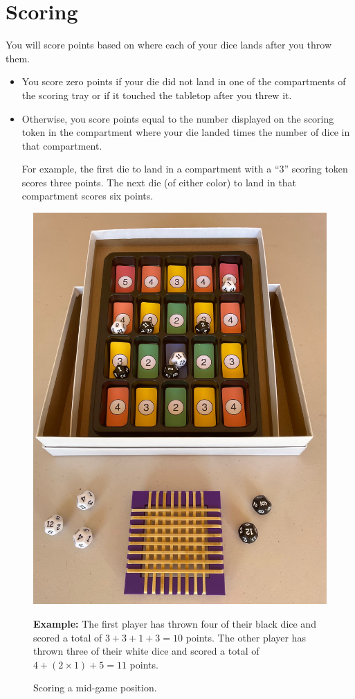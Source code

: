 \documentclass[parskip=half]{scrartcl}
\begin{document}
\section*{Scoring}\label{section:scoring}
You will score points based on where each of your dice lands after you throw them.
\begin{itemize}[leftmargin=*]
\item You score zero points if your die did not land in one of the compartments of the scoring tray or if it touched the tabletop after you threw it.
\item Otherwise, you score points equal to the number displayed on the scoring token in the compartment where your die landed times the number of dice in that compartment.

For example, the first die to land in a compartment with a ``3'' scoring token scores three points. The next die (of either color) to land in that compartment scores six points.
\end{itemize}

\begin{figure}
\raggedright
\includegraphics[width=\textwidth]{rebound_action_shot_3.jpg}
\bigskip
\caption{Scoring a mid-game position.}
\bigskip
\textbf{Example:} The first player has thrown four of their black dice and scored a total of $3+3+1+3 = 10$ points. The other player has thrown three of their white dice and scored a total of $4 + (2\times 1) + 5 = 11$ points.
\end{figure}
\end{document}
